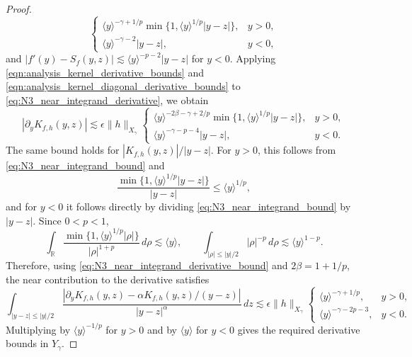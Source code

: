\documentclass[11pt]{amsart}
\theoremstyle{definition}
\theoremstyle{remark}
\numberwithin{equation}{section}
\newcommand{\R}{\mathbb{R}}
\newcommand{\ang}[1]{\langle #1 \rangle}
\begin{document}
\begin{proof}
\[    \begin{cases}
        \ang{y}^{-\gamma+1/p}\min\{1,\ang{y}^{1/p}|y-z|\}, & y>0,\\
        \ang{y}^{-\gamma-2}|y-z|, & y<0,
    \end{cases}
\]
and $|f'(y)-S_f(y,z)|\lesssim\ang{y}^{-p-2}|y-z|$ for $y<0$.
Applying \eqref{eqn:analysis_kernel_derivative_bounds} and \eqref{eqn:analysis_kernel_diagonal_derivative_bounds} to \eqref{eq:N3_near_integrand_derivative}, we obtain
\begin{equation}\label{eq:N3_near_integrand_derivative_bound}
    |\partial_yK_{f,h}(y,z)|\lesssim\epsilon\|h\|_{X_\gamma}
    \begin{cases}
        \ang{y}^{-2\beta-\gamma+2/p}\min\{1,\ang{y}^{1/p}|y-z|\}, & y>0,\\
        \ang{y}^{-\gamma-p-4}|y-z|, & y<0.
    \end{cases}
\end{equation}
The same bound holds for $|K_{f,h}(y,z)|/|y-z|$. For $y>0$, this follows
from \eqref{eq:N3_near_integrand_bound} and
\[
    \frac{\min\{1,\ang{y}^{1/p}|y-z|\}}{|y-z|}\le\ang{y}^{1/p},
\]
and for $y<0$ it follows directly by dividing \eqref{eq:N3_near_integrand_bound} by
$|y-z|$. Since $0<p<1$,
\[
    \int_{\R}\frac{\min\{1,\ang{y}^{1/p}|\rho|\}}{|\rho|^{1+p}}\,d\rho
    \lesssim\ang{y},\qquad
    \int_{|\rho|\le |y|/2}|\rho|^{-p}\,d\rho
    \lesssim\ang{y}^{1-p}.
\]
Therefore, using \eqref{eq:N3_near_integrand_derivative_bound} and $2\beta=1+1/p$, the near contribution to the derivative satisfies
\begin{equation}\label{eq:N3_near_derivative}
    \int_{|y-z|\le |y|/2}
    \frac{|\partial_yK_{f,h}(y,z)-\alpha K_{f,h}(y,z)/(y-z)|}{|y-z|^\alpha}\,dz
    \lesssim\epsilon\|h\|_{X_\gamma}
    \begin{cases}
        \ang{y}^{-\gamma+1/p}, & y>0,\\
        \ang{y}^{-\gamma-2p-3}, & y<0.
    \end{cases}
\end{equation}
Multiplying by $\ang{y}^{-1/p}$ for $y>0$ and by $\ang{y}$ for $y<0$
gives the required derivative bounds in $Y_\gamma$.


\end{proof}
\end{document}
